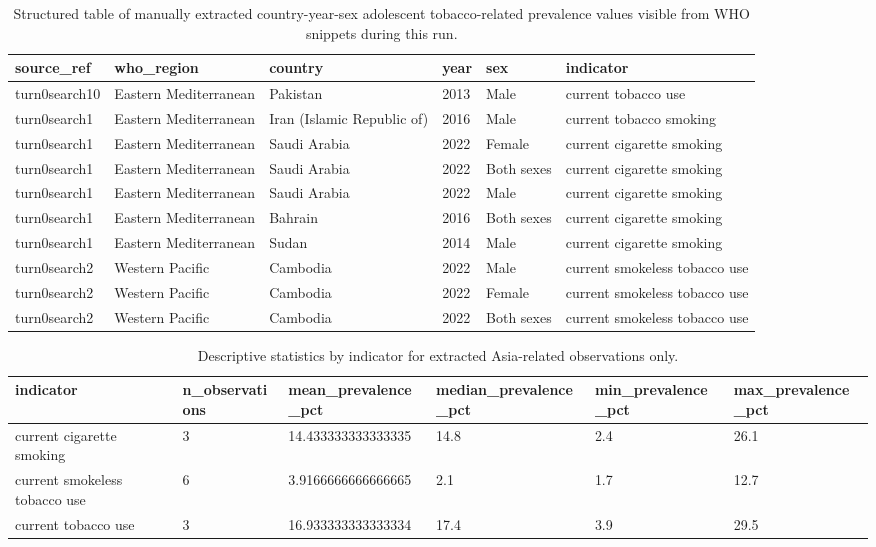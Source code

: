 \documentclass[11pt]{article}
\begin{document}
\begin{table}[t]
\centering
\caption{Structured table of manually extracted country-year-sex adolescent tobacco-related prevalence values visible from WHO snippets during this run.}
\label{tab:artifact-1}
\begin{tabular}{llllll}
\toprule
source\_ref & who\_region & country & year & sex & indicator \\
\midrule
turn0search10 & Eastern Mediterranean & Pakistan & 2013 & Male & current tobacco use \\
turn0search1 & Eastern Mediterranean & Iran (Islamic Republic of) & 2016 & Male & current tobacco smoking \\
turn0search1 & Eastern Mediterranean & Saudi Arabia & 2022 & Female & current cigarette smoking \\
turn0search1 & Eastern Mediterranean & Saudi Arabia & 2022 & Both sexes & current cigarette smoking \\
turn0search1 & Eastern Mediterranean & Saudi Arabia & 2022 & Male & current cigarette smoking \\
turn0search1 & Eastern Mediterranean & Bahrain & 2016 & Both sexes & current cigarette smoking \\
turn0search1 & Eastern Mediterranean & Sudan & 2014 & Male & current cigarette smoking \\
turn0search2 & Western Pacific & Cambodia & 2022 & Male & current smokeless tobacco use \\
turn0search2 & Western Pacific & Cambodia & 2022 & Female & current smokeless tobacco use \\
turn0search2 & Western Pacific & Cambodia & 2022 & Both sexes & current smokeless tobacco use \\
\bottomrule
\end{tabular}
\end{table}

\begin{table}[t]
\centering
\caption{Descriptive statistics by indicator for extracted Asia-related observations only.}
\label{tab:artifact-2}
\begin{tabular}{llllll}
\toprule
indicator & n\_observations & mean\_prevalence\_pct & median\_prevalence\_pct & min\_prevalence\_pct & max\_prevalence\_pct \\
\midrule
current cigarette smoking & 3 & 14.433333333333335 & 14.8 & 2.4 & 26.1 \\
current smokeless tobacco use & 6 & 3.9166666666666665 & 2.1 & 1.7 & 12.7 \\
current tobacco use & 3 & 16.933333333333334 & 17.4 & 3.9 & 29.5 \\
\bottomrule
\end{tabular}
\end{table}
\end{document}
